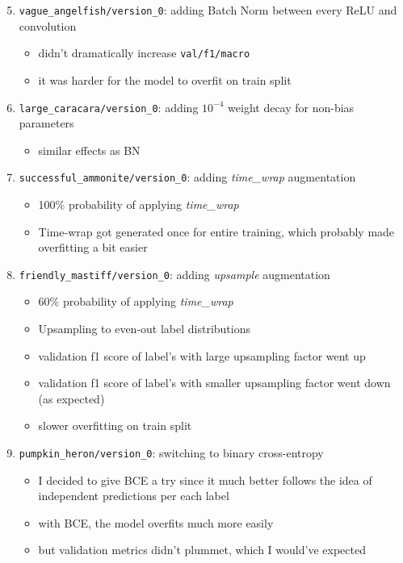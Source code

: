 \documentclass[11pt]{article}
\newcommand{\Log}[1]{{\small\texttt{#1}}}
\newcommand{\Fn}[1]{{\small\textit{#1}}}
\begin{document}
\begin{enumerate}
 \setcounter{enumi}{4}
 \item \Log{vague\_angelfish/version\_0}: adding Batch Norm between every ReLU
   and convolution
    \begin{itemize}
      \item didn't dramatically increase \Log{val/f1/macro}
      \item it was harder for the model to overfit on train split
    \end{itemize}
  \item \Log{large\_caracara/version\_0}: adding $10^{-4}$ weight decay for non-bias parameters
    \begin{itemize}
      \item similar effects as BN
    \end{itemize}
  \item \Log{successful\_ammonite/version\_0}: adding \Fn{time\_wrap} augmentation
    \begin{itemize}
      \item 100\% probability of applying \Fn{time\_wrap}
      \item Time-wrap got generated once for entire training, which probably
        made overfitting a bit easier
    \end{itemize}
  \item \Log{friendly\_mastiff/version\_0}: adding \Fn{upsample} augmentation
    \begin{itemize}
      \item 60\% probability of applying \Fn{time\_wrap}
      \item Upsampling to even-out label distributions
      \item validation f1 score of label's with large upsampling factor went up
      \item validation f1 score of label's with smaller upsampling factor went down (as expected)
      \item slower overfitting on train split
    \end{itemize}
  \item \Log{pumpkin\_heron/version\_0}: switching to binary cross-entropy
    \begin{itemize}
      \item I decided to give BCE a try since it much better follows the idea of independent predictions per each label
      \item with BCE, the model overfits much more easily
      \item but validation metrics didn't plummet, which I would've expected

\end{itemize}
\end{enumerate}
\end{document}
